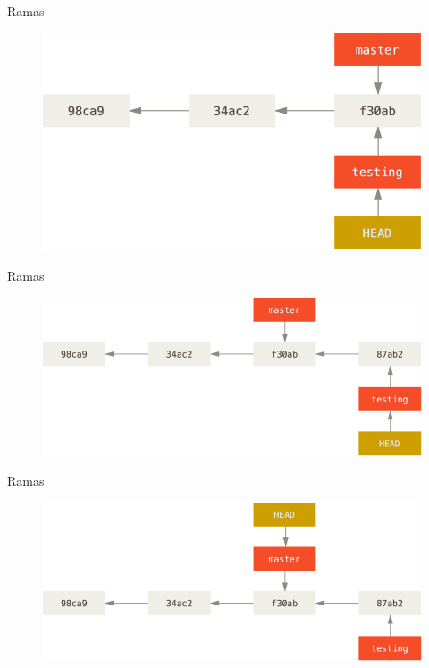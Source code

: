 \documentclass{beamer}
\begin{document}
\begin{frame}{Ramas}	
\begin{figure}
	\centering
	\includegraphics[width=1\linewidth]{img/5.1}
	\label{fig:5_1}
\end{figure}
\end{frame}

\begin{frame}{Ramas}
\begin{figure}
	\centering
	\includegraphics[width=1\linewidth]{img/6}
	\label{fig:6}
\end{figure}
\end{frame}

\begin{frame}{Ramas}
\begin{figure}
	\centering
	\includegraphics[width=1\linewidth]{img/7}
	\label{fig:7}
\end{figure}
\end{frame}
\end{document}
